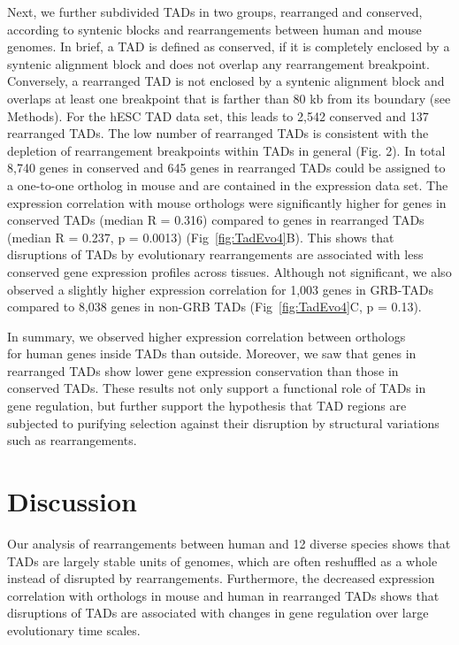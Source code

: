 \documentclass[a4paper,twoside=true,openright,parskip=full,chapterprefix=true,11pt,headings=normal,bibliography=totoc,listof=totoc,titlepage=on,captions=tableabove,draft=false]{scrreprt}
\theoremstyle{definition}
\theoremstyle{definition}
\theoremstyle{definition}
\theoremstyle{remark}
\begin{document}
Next, we further subdivided TADs in two groups, rearranged and
conserved, according to syntenic blocks and rearrangements between human
and mouse genomes. In brief, a TAD is defined as conserved, if it is
completely enclosed by a syntenic alignment block and does not overlap
any rearrangement breakpoint. Conversely, a rearranged TAD is not
enclosed by a syntenic alignment block and overlaps at least one
breakpoint that is farther than 80 kb from its boundary (see Methods).
For the hESC TAD data set, this leads to 2,542 conserved and 137
rearranged TADs. The low number of rearranged TADs is consistent with
the depletion of rearrangement breakpoints within TADs in general (Fig.
2). In total 8,740 genes in conserved and 645 genes in rearranged TADs
could be assigned to a one-to-one ortholog in mouse and are contained in
the expression data set. The expression correlation with mouse orthologs
were significantly higher for genes in conserved TADs (median R = 0.316)
compared to genes in rearranged TADs (median R = 0.237, p = 0.0013)
(Fig~\ref{fig:TadEvo4}B). This shows that disruptions of TADs by
evolutionary rearrangements are associated with less conserved gene
expression profiles across tissues. Although not significant, we also
observed a slightly higher expression correlation for 1,003 genes in
GRB-TADs compared to 8,038 genes in non-GRB TADs
(Fig~\ref{fig:TadEvo4}C, p = 0.13).

In summary, we observed higher expression correlation between
orthologs\\
for human genes inside TADs than outside. Moreover, we saw that genes in
rearranged TADs show lower gene expression conservation than those in
conserved TADs. These results not only support a functional role of TADs
in gene regulation, but further support the hypothesis that TAD regions
are subjected to purifying selection against their disruption by
structural variations such as rearrangements.

\section{Discussion}\label{discussion-1}

Our analysis of rearrangements between human and 12 diverse species
shows that TADs are largely stable units of genomes, which are often
reshuffled as a whole instead of disrupted by rearrangements.
Furthermore, the decreased expression correlation with orthologs in
mouse and human in rearranged TADs shows that disruptions of TADs are
associated with changes in gene regulation over large evolutionary time
scales.
\end{document}
